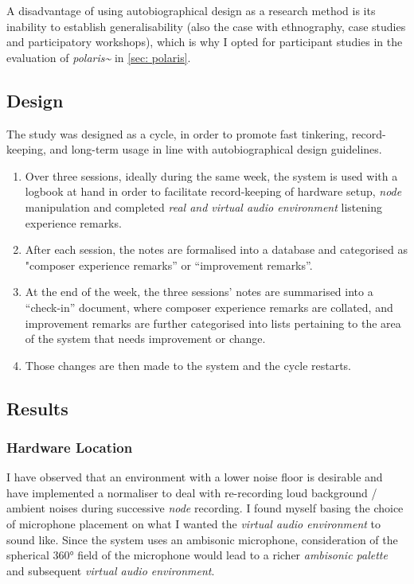 A disadvantage of using autobiographical design as a research method is its inability to establish generalisability (also the case with ethnography, case studies and participatory workshops), which is why I opted for participant studies in the evaluation of \textit{polaris\textasciitilde{}} in \autoref{sec: polaris}.

\subsection{Design} \label{sec: area-study-design}
The study was designed as a cycle, in order to promote fast tinkering, record-keeping, and long-term usage in line with autobiographical design guidelines. 
\begin{enumerate}
    \item Over three sessions, ideally during the same week, the system is used with a logbook at hand in order to facilitate record-keeping of hardware setup, \textit{node} manipulation and completed \textit{real and virtual audio environment} listening experience remarks.
    \item After each session, the notes are formalised into a database and categorised as "composer experience remarks” or “improvement remarks”.
    \item At the end of the week, the three sessions’ notes are summarised into a “check-in” document, where composer experience remarks are collated, and improvement remarks are further categorised into lists pertaining to the area of the system that needs improvement or change.
    \item Those changes are then made to the system and the cycle restarts.
\end{enumerate}

\subsection{Results}                            \label{sec: area-study-results}
\subsubsection{Hardware Location}               \label{sec: area-study-results-hwloc}
I have observed that an environment with a lower noise floor is desirable and have implemented a normaliser to deal with re-recording loud background / ambient noises during successive \textit{node} recording. I found myself basing the choice of microphone placement on what I wanted the \textit{virtual audio environment} to sound like. Since the system uses an ambisonic microphone, consideration of the spherical 360° field of the microphone would lead to a richer \textit{ambisonic palette} and subsequent \textit{virtual audio environment}.

